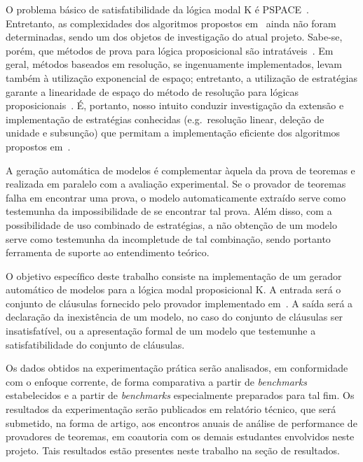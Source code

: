 O problema básico de satisfatibilidade da lógica modal K é
PSPACE~\cite{complex_modal}. %
Entretanto, as complexidades dos algoritmos propostos em~\cite{nalon} ainda não
foram determinadas, %
sendo um dos objetos de investigação do atual projeto. Sabe-se, porém, que
métodos de prova para lógica proposicional são
intratáveis~\cite{complex_thproving}. %
Em geral, métodos baseados em resolução, se ingenuamente implementados, levam
também à utilização exponencial de espaço; entretanto, a utilização de
estratégias garante a linearidade de espaço do método de resolução para lógicas
proposicionais~\cite{toran:prop_resolution}. %
É, portanto, nosso intuito conduzir investigação da extensão e implementação de
estratégias conhecidas (e.g.\ resolução linear, deleção de unidade e subsunção)
que permitam a implementação eficiente dos algoritmos propostos em~\cite{nalon}.

A geração automática de modelos é complementar àquela da prova de teoremas e
realizada em paralelo com a avaliação experimental. Se o provador de teoremas
falha em encontrar uma prova, o modelo automaticamente extraído serve como
testemunha da impossibilidade de se encontrar tal prova. Além disso, com a
possibilidade de uso combinado de estratégias, a não obtenção de um modelo serve
como testemunha da incompletude de tal combinação, sendo portanto ferramenta de
suporte ao entendimento teórico.

O objetivo específico deste trabalho consiste na implementação de um gerador
automático de modelos para a lógica modal proposicional K. A entrada será o
conjunto de cláusulas fornecido pelo provador implementado
em~\cite{silva:impl_provador}. %
A saída será a declaração da inexistência de um modelo, no caso do conjunto de
cláusulas ser insatisfatível, ou a apresentação formal de um modelo que
testemunhe a satisfatibilidade do conjunto de cláusulas.

Os dados obtidos na experimentação prática serão analisados, em conformidade com
o enfoque corrente, de forma comparativa a partir de \textit{benchmarks}
estabelecidos e a partir de \textit{benchmarks} especialmente preparados para
tal fim. Os resultados da experimentação serão publicados em relatório técnico,
que será submetido, na forma de artigo, aos encontros anuais de análise de
performance de provadores de teoremas, em coautoria com os demais estudantes
envolvidos neste projeto. Tais resultados estão presentes neste trabalho na
seção de resultados.











